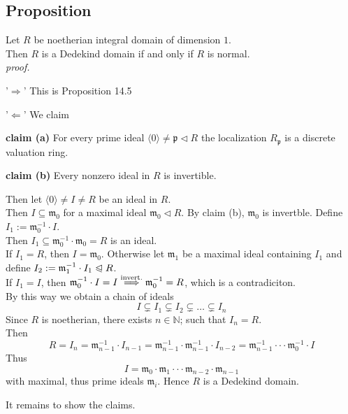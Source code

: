 \documentclass[12pt]{book}
\begin{document}
\begin{spacing}{1.3}
\subsection{Proposition} %
Let $R$ be noetherian integral domain of dimension $1$.\\
Then $R$ is a Dedekind domain if and only if $R$ is normal.\\
\textit{proof.}
\begin{compactitem}
\item['$\Rightarrow$'] This is Proposition 14.5
\item['$\Leftarrow$'] We claim
\begin{compactenum}
\item[\textbf{claim (a)}] For every prime ideal $\langle 0 \rangle \neq \mathfrak{p} \triangleleft R$ the localization $R_{\mathfrak{p}}$ is a discrete valuation ring.
\item[\textbf{claim (b)}] Every nonzero ideal in $R$ is invertible.
\end{compactenum}
Then let $\langle 0 \rangle \neq I \neq R$ be an ideal in $R$.\\
Then $I \subseteq \mathfrak{m}_0$ for a maximal ideal $\mathfrak{m}_0 \triangleleft R$. By claim (b), $\mathfrak{m}_0$ is invertble. Define $I_1 := \mathfrak{m}_0^{-1} \cdot I$.\\
Then $I_1 \subseteq \mathfrak{m}_0^{-1} \cdot \mathfrak{m}_0 = R$ is an ideal.\\
If $I_1=R$, then $I=\mathfrak{m}_0$. Otherwise let $\mathfrak{m}_1$ be a maximal ideal containing $I_1$ and define $I_2:=\mathfrak{m}_1^{-1}\cdot I_1 \trianglelefteqslant R$.\\
If $I_1=I$, then $\mathfrak{m}_0^{-1} \cdot I=I \overset{\rm{invert.}}{\Longrightarrow} \mathfrak{m}_0^{-1}=R$, which is a contradiciton.\\
By this way we obtain a chain of ideals
$$I \subsetneq I_1 \subsetneq I_2 \subsetneq \ldots \subsetneq I_n$$
Since $R$ is noetherian, there exists $n \in \mathbb{N}$; such that $I_n=R$. \\
Then $$R=I_n=\mathfrak{m}_{n-1}^{-1} \cdot I_{n-1}=\mathfrak{m}_{n-1}^{-1} \cdot \mathfrak{m}_{n-1}^{-1} \cdot I_{n-2} = \mathfrak{m}_{n-1}^{-1} \cdot \cdot \cdot \mathfrak{m}_0^{-1} \cdot I$$
Thus
$$I=\mathfrak{m}_0 \cdot \mathfrak{m}_1 \cdot \cdot \cdot \mathfrak{m}_{n-2} \cdot \mathfrak{m}_{n-1}$$
with maximal, thus prime ideals $\mathfrak{m}_i$. Hence $R$ is a Dedekind domain.
\end{compactitem}
It remains to show the claims.

\end{spacing}
\end{document}
